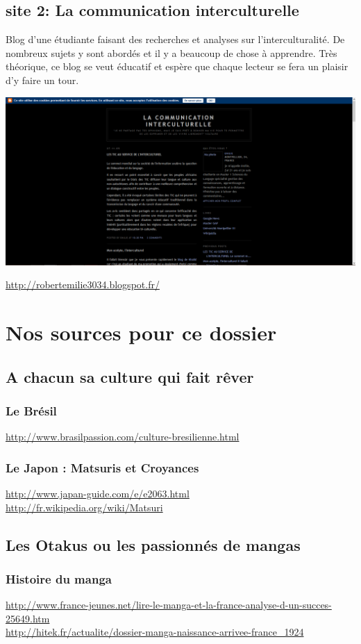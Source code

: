 \section{site 2: La communication interculturelle}
Blog d’une étudiante faisant des recherches et analyses sur l’interculturalité. De nombreux sujets y sont abordés et il y a beaucoup de chose à apprendre. Très théorique, ce blog se veut éducatif et espère que chaque lecteur se fera un plaisir d’y faire un tour.
\begin{center}
\includegraphics[scale=0.25]{ComInter.png}
\end{center}
\url{http://robertemilie3034.blogspot.fr/}


\chapter{Nos sources pour ce dossier}
\section{A chacun sa culture qui fait rêver}
\subsection{Le Brésil}
\noindent
\url{http://www.brasilpassion.com/culture-bresilienne.html}
\subsection{Le Japon : Matsuris et Croyances}
\noindent
\url{http://www.japan-guide.com/e/e2063.html}\\
\url{http://fr.wikipedia.org/wiki/Matsuri}

\section{Les Otakus ou les passionnés de mangas}
\subsection{Histoire du manga}
\noindent
\url{http://www.france-jeunes.net/lire-le-manga-et-la-france-analyse-d-un-succes-25649.htm}\\
\url{http://hitek.fr/actualite/dossier-manga-naissance-arrivee-france_1924}

